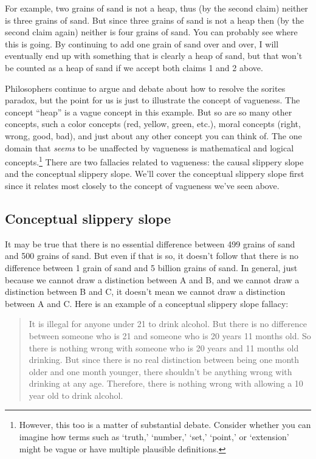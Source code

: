 For example, two grains of sand is not a heap, thus (by the second claim) neither is three grains of sand. But since three grains of sand is not a heap then (by the second claim again) neither is four grains of sand. You can probably see where this is going. By continuing to add one grain of sand over and over, I will eventually end up with something that is clearly a heap of sand, but that won't be counted as a heap of sand if we accept both claims 1 and 2 above.

Philosophers continue to argue and debate about how to resolve the sorites paradox, but the point for us is just to illustrate the concept of vagueness. The concept ``heap'' is a vague concept in this example. But so are so many other concepts, such a color concepts (red, yellow, green, etc.), moral concepts (right, wrong, good, bad), and just about any other concept you can think of. The one domain that \emph{seems} to be unaffected by vagueness is mathematical and logical concepts.\footnote{However, this too is a matter of substantial debate. Consider whether you can imagine how terms such as `truth,' `number,' `set,' `point,' or `extension' might be vague or have multiple plausible definitions.} There are two fallacies related to vagueness: the causal slippery slope and the conceptual slippery slope. We'll cover the conceptual slippery slope first since it relates most closely to the concept of vagueness we've seen above.

\subsection{Conceptual slippery slope}

It may be true that there is no essential difference between 499 grains of sand and 500 grains of sand. But even if that is so, it doesn't follow that there is no difference between 1 grain of sand and 5 billion grains of sand. In general, just because we cannot draw a distinction between A and B, and we cannot draw a distinction between B and C, it doesn't mean we cannot draw a distinction between A and C. Here is an example of a conceptual slippery slope fallacy:

\begin{quote}
It is illegal for anyone under 21 to drink alcohol. But there is no difference between someone who is 21 and someone who is 20 years 11 months old. So there is nothing wrong with someone who is 20 years and 11 months old drinking. But since there is no real distinction between being one month older and one month younger, there shouldn't be anything wrong with drinking at any age. Therefore, there is nothing wrong with allowing a 10 year old to drink alcohol.
\end{quote}

